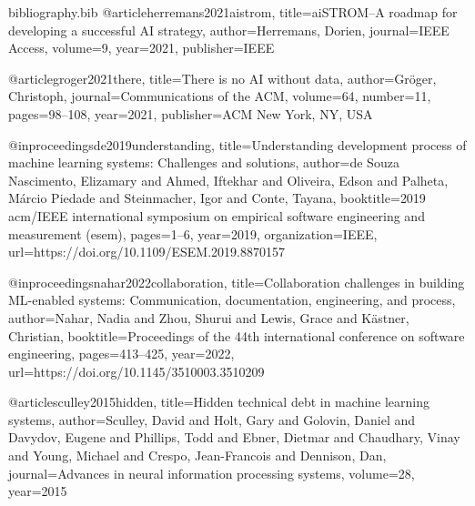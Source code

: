%
%

\begin{filecontents}{bibliography.bib}
@article{herremans2021aistrom,
  title={ai{STROM}--A roadmap for developing a successful {AI} strategy},
  author={Herremans, Dorien},
  journal={IEEE Access},
  volume={9},
  year={2021},
  publisher={IEEE}
}

@article{groger2021there,
  title={There is no {AI} without data},
  author={Gr{\"o}ger, Christoph},
  journal={Communications of the ACM},
  volume={64},
  number={11},
  pages={98--108},
  year={2021},
  publisher={ACM New York, NY, USA}
}

@inproceedings{de2019understanding,
  title={Understanding development process of machine learning systems: Challenges and solutions},
  author={de Souza Nascimento, Elizamary and Ahmed, Iftekhar and Oliveira, Edson and Palheta, M{\'a}rcio Piedade and Steinmacher, Igor and Conte, Tayana},
  booktitle={2019 acm/IEEE international symposium on empirical software engineering and measurement (esem)},
  pages={1--6},
  year={2019},
  organization={IEEE},
  url={https://doi.org/10.1109/ESEM.2019.8870157}
}

@inproceedings{nahar2022collaboration,
  title={Collaboration challenges in building {ML}-enabled systems: Communication, documentation, engineering, and process},
  author={Nahar, Nadia and Zhou, Shurui and Lewis, Grace and K{\"a}stner, Christian},
  booktitle={Proceedings of the 44th international conference on software engineering},
  pages={413--425},
  year={2022},
  url={https://doi.org/10.1145/3510003.3510209}
}

@article{sculley2015hidden,
  title={Hidden technical debt in machine learning systems},
  author={Sculley, David and Holt, Gary and Golovin, Daniel and Davydov, Eugene and Phillips, Todd and Ebner, Dietmar and Chaudhary, Vinay and Young, Michael and Crespo, Jean-Francois and Dennison, Dan},
  journal={Advances in neural information processing systems},
  volume={28},
  year={2015}
}


\end{filecontents}
